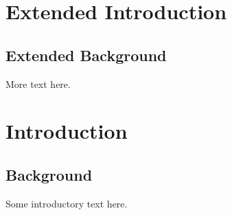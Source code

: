 \documentclass[11pt]{report}
\begin{document}
\chapter*{Extended Introduction}
\section{Extended Background}
More text here.

\chapter{Introduction}
\section{Background}
Some introductory text here.
\end{document}
